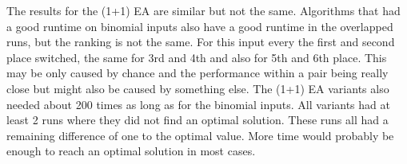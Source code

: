 The results for the (1+1) EA are similar but not the same.
Algorithms that had a good runtime on binomial inputs also have a good runtime in the overlapped runs, but the ranking is not the same.
For this input every the first and second place switched, the same for 3rd and 4th and also for 5th and 6th place.
This may be only caused by chance and the performance within a pair being really close but might also be caused by something else.
The (1+1) EA variants also needed about 200 times as long as for the binomial inputs.
All variants had at least 2 runs where they did not find an optimal solution.
These runs all had a remaining difference of one to the optimal value.
More time would probably be enough to reach an optimal solution in most cases.